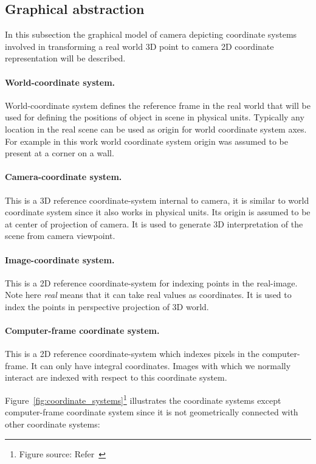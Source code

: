 \subsection{Graphical abstraction}  
In this subsection the graphical model of camera depicting coordinate systems involved in transforming a real world 3D point to camera 2D coordinate representation will be described.
   
\paragraph{World-coordinate system.}  
World-coordinate system defines the reference frame in the real world that will be used for defining the positions of object in scene in physical units. Typically any location in the real scene can be used as origin for world coordinate system axes. For example in this work world coordinate system origin was assumed to be present at a corner on a wall.  
  
\paragraph{Camera-coordinate system.}  
This is a 3D reference coordinate-system internal to camera, it is similar to world coordinate system since it also works in physical units. Its origin is assumed to be at center of projection of camera. It is used to generate 3D interpretation of the scene from camera viewpoint.  
  
\paragraph{Image-coordinate system.}  
This is a 2D reference coordinate-system for indexing points in the real-image. Note here \textit{real} means that it can take real values as coordinates. It is used to index the points in perspective projection of 3D world.  
  
\paragraph{Computer-frame coordinate system.}  
This is a 2D reference coordinate-system which indexes pixels in the computer-frame. It can only have integral coordinates. Images with which we normally interact are indexed with respect to this coordinate system. \newline  
  
Figure~\ref{fig:coordinate_systems}\footnote{Figure source: Refer~\cite{8}} illustrates the coordinate systems except computer-frame coordinate system since it is not geometrically connected with other coordinate systems:  
  
